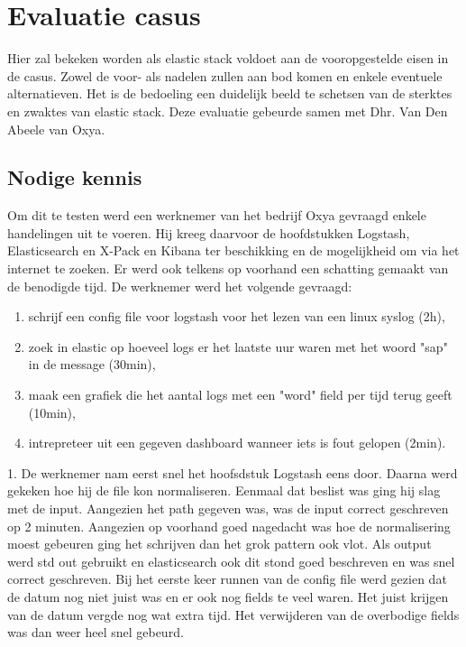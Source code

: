 
\chapter{Evaluatie casus}
\label{ch:evaluatie-casus}

Hier zal bekeken worden als elastic stack voldoet aan de vooropgestelde eisen in de casus.
Zowel de voor- als nadelen zullen aan bod komen en enkele eventuele alternatieven. Het is de bedoeling een duidelijk beeld te schetsen van de sterktes en zwaktes van elastic stack.
Deze evaluatie gebeurde samen met Dhr. Van Den Abeele van Oxya.

\section{Nodige kennis}
\label{sec:nodige-kennis}
	
Om dit te testen werd een werknemer van het bedrijf Oxya gevraagd enkele handelingen uit te voeren.
Hij kreeg daarvoor de hoofdstukken Logstash, Elasticsearch en X-Pack en Kibana ter beschikking en de mogelijkheid om via het internet te zoeken. 
Er werd ook telkens op voorhand een schatting gemaakt van de benodigde tijd.
De werknemer werd het volgende gevraagd:
\begin{enumerate}
    \item schrijf een config file voor logstash voor het lezen van een linux syslog (2h),
    \item zoek in elastic op hoeveel logs er het laatste uur waren met het woord "sap" in de message (30min),
    \item maak een grafiek die het aantal logs met een "word" field per tijd terug geeft (10min),
	\item intrepreteer uit een gegeven dashboard wanneer iets is fout gelopen (2min). 
\end{enumerate}

1. 	De werknemer nam eerst snel het hoofsdstuk Logstash eens door. Daarna werd gekeken hoe hij de file kon normaliseren. 
Eenmaal dat beslist was ging hij slag met de input. Aangezien het path gegeven was, was de input correct geschreven op 2 minuten. Aangezien op voorhand goed nagedacht was hoe de normalisering moest gebeuren ging het schrijven dan het grok pattern ook vlot.
Als output werd std out gebruikt en elasticsearch ook dit stond goed beschreven en was snel correct geschreven. 
Bij het eerste keer runnen van de config file werd gezien dat de datum nog niet juist was en er ook nog fields te veel waren. 
Het juist krijgen van de datum vergde nog wat extra tijd. Het verwijderen van de overbodige fields was dan weer heel snel gebeurd.


